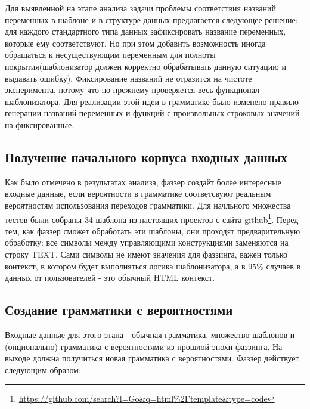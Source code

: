 \documentclass[a4paper]{article}
\begin{document}
Для выявленной на этапе анализа задачи проблемы соответствия названий переменных в шаблоне и в структуре данных предлагается следующее решение: для каждого стандартного типа данных зафиксировать название переменных, которые ему соответствуют. Но при этом добавить возможность иногда обращаться к несуществующим переменным для полноты покрытия(шаблонизатор должен корректно обрабатывать данную ситуацию и выдавать ошибку). Фиксирование названий не отразится на чистоте эксперимента, потому что по прежнему проверяется весь функционал шаблонизатора. Для реализации этой идеи в грамматике было изменено правило генерации названий переменных и  функций с произвольных строковых значений на фиксированные.

\subsection{Получение начального корпуса входных данных}

Как было отмечено в результатах анализа, фаззер создаёт более интересные входные данные, если вероятности в грамматике соответсвуют реальным вероятностям использования переходов грамматики. Для начльного множества тестов были собраны 34 шаблона из настоящих проектов с сайта github\footnote{\href{https://github.com/search?l=Go\&q=html\%2Ftemplate\&type=code}{https://github.com/search?l=Go\&q=html\%2Ftemplate\&type=code}}. Перед тем, как фаззер сможет обработать эти шаблоны, они проходят предварительную обработку: все символы между управляющими конструкциями заменяются на строку TEXT. Сами символы не имеют значения для фаззинга, важен только контекст, в котором будет выполняться логика шаблонизатора, а в $95\%$ случаев в данных от пользователей - это обычный HTML контекст.

\subsection{Создание грамматики с вероятностями}
Входные данные для этого этапа - обычная грамматика, множество шаблонов и (опционально) грамматика с вероятностями из прошлой эпохи фаззинга. На выходе должна получиться новая грамматика с вероятностями. Фаззер действует следующим образом:
\end{document}
